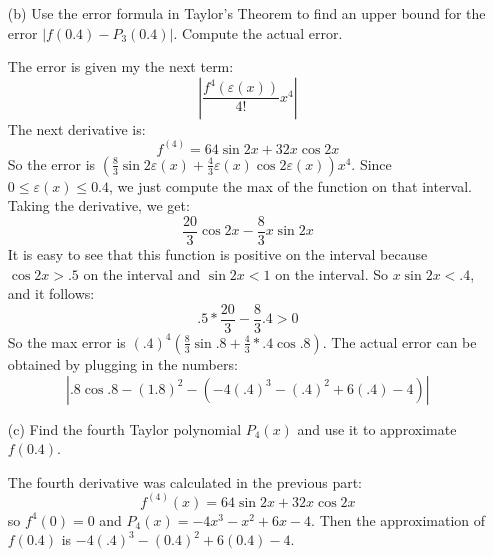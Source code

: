 \documentclass{article}
\begin{document}
\begin{itemize}
            \item [(b)] Use the error formula in Taylor's Theorem to find an upper bound for the error $\lvert f(0.4) - P_{3}(0.4) \rvert$. Compute the actual error.
                \begin{answer}
                    The error is given my the next term:
                        \begin{equation*}
                            \left\lvert \dfrac{f^{4}(\varepsilon(x))}{4!} x^{4} \right\rvert
                        \end{equation*}
                    The next derivative is:
                        \begin{equation*}
                            f^{(4)} = 64 \sin{ 2x} + 32x \cos{2x} 
                        \end{equation*}
                    So the error is $(\frac{8}{3} \sin{2\varepsilon(x)} + \frac{4}{3}\varepsilon(x) \cos{2\varepsilon(x)})x^{4}$. Since $0 \leq \varepsilon(x) \leq 0.4$, we just compute the max of the function on that interval.
                    Taking the derivative, we get:
                        \begin{equation*}
                            \dfrac{20}{3} \cos{2x} - \dfrac{8}{3} x\sin{2x}
                        \end{equation*}
                    It is easy to see that this function is positive on the interval because $\cos{2x} > .5$ on the interval and $\sin{2x} < 1$ on the interval. So $x \sin{ 2x} < .4$, and it follows:
                        \begin{equation*}
                            .5 * \dfrac{20}{3} - \dfrac{8}{3} .4 > 0
                        \end{equation*}
                    So the max error is $(.4)^{4}(\frac{8}{3} \sin{.8} + \frac{4}{3}* .4 \cos{.8})$. The actual error can be obtained by plugging in the numbers:
                        \begin{equation*}
                            \left\lvert .8 \cos{.8} - (1.8)^{2} - (-4(.4)^{3} - (.4)^{2} + 6(.4) - 4) \right\rvert
                        \end{equation*}
                \end{answer}

            \item [(c)] Find the fourth Taylor polynomial $P_{4}(x)$ and use it to approximate $f(0.4)$.
                \begin{answer}
                    The fourth derivative was calculated in the previous part:
                        \begin{equation*}
                            f^{(4)}(x) = 64 \sin{2x} + 32x \cos{2x}
                        \end{equation*}
                    so $f^{4}(0) = 0$ and $P_{4}(x) = -4x^{3} - x^{2} + 6x - 4$. Then the approximation of $f(0.4)$ is $-4(.4)^{3} - (0.4)^{2} + 6(0.4) - 4$.
                \end{answer}


\end{itemize}
\end{document}
